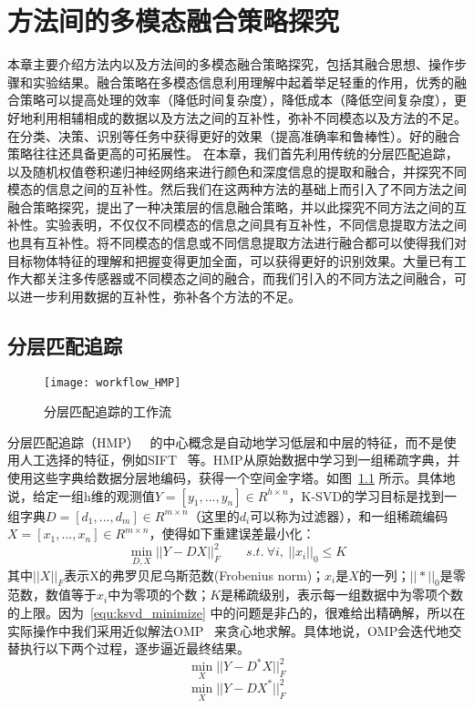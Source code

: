 \chapter{方法间的多模态融合策略探究}
\label{cha:fStrategy}

本章主要介绍方法内以及方法间的多模态融合策略探究，包括其融合思想、操作步骤和实验结果。融合策略在多模态信息利用理解中起着举足轻重的作用，优秀的融合策略可以提高处理的效率（降低时间复杂度），降低成本（降低空间复杂度），更好地利用相辅相成的数据以及方法之间的互补性，弥补不同模态以及方法的不足。在分类、决策、识别等任务中获得更好的效果（提高准确率和鲁棒性）。好的融合策略往往还具备更高的可拓展性。
在本章，我们首先利用传统的分层匹配追踪，以及随机权值卷积递归神经网络来进行颜色和深度信息的提取和融合，并探究不同模态的信息之间的互补性。然后我们在这两种方法的基础上而引入了不同方法之间融合策略探究，提出了一种决策层的信息融合策略，并以此探究不同方法之间的互补性。实验表明，不仅仅不同模态的信息之间具有互补性，不同信息提取方法之间也具有互补性。将不同模态的信息或不同信息提取方法进行融合都可以使得我们对目标物体特征的理解和把握变得更加全面，可以获得更好的识别效果。大量已有工作大都关注多传感器或不同模态之间的融合，而我们引入的不同方法之间融合，可以进一步利用数据的互补性，弥补各个方法的不足。

\section{分层匹配追踪}
\label{sec:HMP}

\begin{figure}[H] %
  \centering
  \texttt{[image: workflow\_HMP]}
  \caption{分层匹配追踪的工作流}
  \label{fig:workflow_HMP}
\end{figure}

分层匹配追踪（HMP）~ 的中心概念是自动地学习低层和中层的特征，而不是使用人工选择的特征，例如SIFT~ 等。HMP从原始数据中学习到一组稀疏字典，并使用这些字典给数据分层地编码，获得一个空间金字塔。如图~\ref{fig:workflow_HMP} 所示。具体地说，给定一组h维的观测值$Y = [y_1, ..., y_n] \in R^{h\times n}$，K-SVD的学习目标是找到一组字典$D = [d_1, ..., d_m] \in R^{m \times n}$（这里的$d_i$可以称为过滤器），和一组稀疏编码$X = [x_1, ..., x_n] \in R^{m \times n}$，使得如下重建误差最小化：
\begin{equation}
\label{equ:ksvd_minimize}
\underset{D,X}{\min}{||Y-DX||_F^2} \qquad s.t. ~ \forall i,~ ||x_i||_0 \leq K
\end{equation}
其中$||X||_F$表示X的弗罗贝尼乌斯范数(Frobenius norm)；$x_i$是$X$的一列；$||*||_0$是零范数，数值等于$x_i$中为零项的个数；$K$是稀疏级别，表示每一组数据中为零项个数的上限。因为~\ref{equ:ksvd_minimize} 中的问题是非凸的，很难给出精确解，所以在实际操作中我们采用近似解法OMP~ 来贪心地求解。具体地说，OMP会迭代地交替执行以下两个过程，逐步逼近最终结果。
$$
\underset{X}{\min}{||Y-D^*X||_F^2}
$$
$$
\underset{X}{\min}{||Y-DX^*||_F^2}
$$

